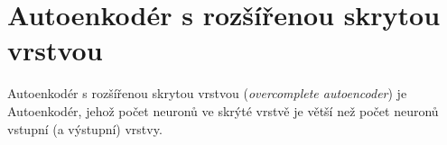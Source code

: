 \section{Autoenkodér s rozšířenou skrytou vrstvou}
\label{sec:overcomplete_autoencoder}
Autoenkodér s rozšířenou skrytou vrstvou (\emph{overcomplete autoencoder}) je Autoenkodér, jehož počet neuronů ve skrýté vrstvě je větší než počet neuronů vstupní (a výstupní) vrstvy. \cite{Charte2018}